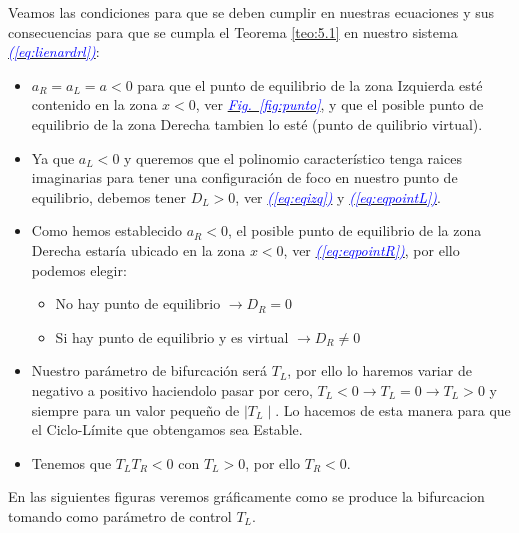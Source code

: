 \documentclass[12pt,a4paper]{report} %
\newcommand{\fref}[1]{\hyperref[#1]{\textcolor{blue}{\textit{Fig.~\ref*{#1}}}}}
\newcommand{\eref}[1]{\hyperref[#1]{\textcolor{blue}{\textit{(\ref*{#1})}}}}
\begin{document}
	Veamos las condiciones para que se deben cumplir en nuestras ecuaciones y sus consecuencias para que se cumpla el Teorema \ref{teo:5.1} en nuestro sistema \eref{eq:lienardrl}:
		\begin{itemize}
			\item $a_R=a_L=a<0$ para que el punto de equilibrio de la zona Izquierda esté contenido en la zona $x<0$, ver \fref{fig:punto}, y que el posible punto de equilibrio de la zona Derecha tambien lo esté (punto de quilibrio virtual).
			\item Ya que $a_L<0$ y queremos que el polinomio característico  tenga raices imaginarias para tener una configuración de foco en nuestro punto de equilibrio, debemos tener $D_L>0$, ver \eref{eq:eqizq} y \eref{eq:eqpointL}.
			\item Como hemos establecido $a_R<0$, el posible punto de equilibrio de la zona Derecha estaría ubicado en la zona $x<0$, ver \eref{eq:eqpointR}, por ello podemos elegir:\begin{itemize}
				\item No hay punto de equilibrio $\rightarrow D_R=0$ 
				\item Si hay punto de equilibrio y es virtual $\rightarrow D_R\neq0$ 
			\end{itemize}

			\item Nuestro parámetro de bifurcación será $T_L$, por ello lo haremos variar de negativo a positivo haciendolo pasar por cero, $T_L<0 \rightarrow T_L=0 \rightarrow T_L>0$ y siempre para un valor pequeño de $\mid T_L \mid$. Lo hacemos de esta manera para que el Ciclo-Límite que obtengamos sea Estable.
			\item Tenemos que $T_LT_R<0$ con $T_L>0$, por ello  $T_R<0$.
		\end{itemize}
		
		
	\vspace{0.5cm} En las siguientes figuras veremos gráficamente como se produce la bifurcacion tomando como parámetro de control $T_L$.
		
	\newpage
	
\end{document}
